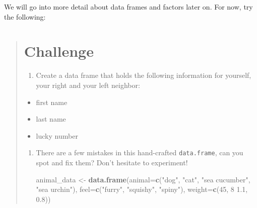\documentclass[]{book}
\newenvironment{Shaded}{\begin{snugshade}}{\end{snugshade}}
\newcommand{\KeywordTok}[1]{\textcolor[rgb]{0.13,0.29,0.53}{\textbf{{#1}}}}
\newcommand{\DataTypeTok}[1]{\textcolor[rgb]{0.13,0.29,0.53}{{#1}}}
\newcommand{\DecValTok}[1]{\textcolor[rgb]{0.00,0.00,0.81}{{#1}}}
\newcommand{\FloatTok}[1]{\textcolor[rgb]{0.00,0.00,0.81}{{#1}}}
\newcommand{\StringTok}[1]{\textcolor[rgb]{0.31,0.60,0.02}{{#1}}}
\newcommand{\NormalTok}[1]{{#1}}
\providecommand{\tightlist}{%
  \setlength{\itemsep}{0pt}\setlength{\parskip}{0pt}}
\theoremstyle{definition}
\theoremstyle{definition}
\theoremstyle{remark}
\begin{document}
We will go into more detail about data frames and factors later on. For
now, try the following:

\begin{quote}
\section{Challenge}\label{challenge}

\begin{enumerate}
\def\labelenumi{\arabic{enumi}.}
\tightlist
\item
  Create a data frame that holds the following information for yourself,
  your right and your left neighbor:
\end{enumerate}

\begin{itemize}
\tightlist
\item
  first name
\item
  last name
\item
  lucky number
\end{itemize}

\begin{enumerate}
\def\labelenumi{\arabic{enumi}.}
\setcounter{enumi}{1}
\item
  There are a few mistakes in this hand-crafted \texttt{data.frame}, can
  you spot and fix them? Don't hesitate to experiment!

\begin{Shaded}
\begin{Highlighting}[]
\NormalTok{animal_data <-}\StringTok{ }\KeywordTok{data.frame}\NormalTok{(}\DataTypeTok{animal=}\KeywordTok{c}\NormalTok{(}\StringTok{"dog"}\NormalTok{, }\StringTok{"cat"}\NormalTok{, }\StringTok{"sea cucumber"}\NormalTok{, }\StringTok{"sea urchin"}\NormalTok{),}
                          \DataTypeTok{feel=}\KeywordTok{c}\NormalTok{(}\StringTok{"furry"}\NormalTok{, }\StringTok{"squishy"}\NormalTok{, }\StringTok{"spiny"}\NormalTok{),}
                          \DataTypeTok{weight=}\KeywordTok{c}\NormalTok{(}\DecValTok{45}\NormalTok{, }\DecValTok{8} \FloatTok{1.1}\NormalTok{, }\FloatTok{0.8}\NormalTok{))}
\end{Highlighting}
\end{Shaded}
\end{enumerate}
\end{quote}
\end{document}
